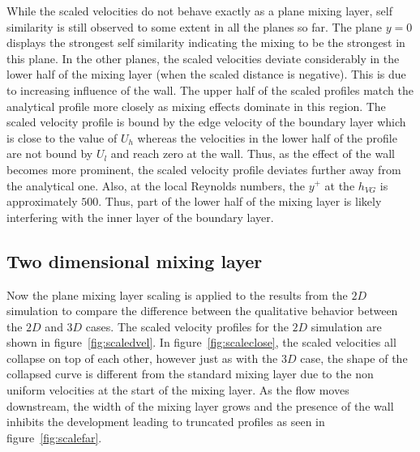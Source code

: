 While the scaled velocities do not behave exactly as a plane mixing layer, self similarity is still observed to some extent in all the planes so far. The plane $y=0$ displays the strongest self similarity indicating the mixing to be the strongest in this plane. In the other planes, the scaled velocities deviate considerably in the lower half of the mixing layer (when the scaled distance is negative). This is due to increasing influence of the wall. The upper half of the scaled profiles match the analytical profile more closely as mixing effects dominate in this region. The scaled velocity profile is bound by the edge velocity of the boundary layer which is close to the value of $U_h$ whereas the velocities in the lower half of the profile are not bound by $U_l$ and reach zero at the wall. Thus, as the effect of the wall becomes more prominent, the scaled velocity profile deviates further away from the analytical one. Also, at the local Reynolds numbers, the $y^+$ at the $h_{VG}$ is approximately $500$. Thus, part of the lower half of the mixing layer is likely interfering with the inner layer of the boundary layer. %
\subsection{Two dimensional mixing layer}
Now the plane mixing layer scaling is applied to the results from the $2D$ simulation to compare the difference between the qualitative behavior between the $2D$ and $3D$ cases. The scaled velocity profiles for the $2D$ simulation are shown in figure~\ref{fig:scaledvel}. In figure~\ref{fig:scaleclose}, the scaled velocities all collapse on top of each other, however just as with the $3D$ case, the shape of the collapsed curve is different from the standard mixing layer due to the non uniform velocities at the start of the mixing layer. As the flow moves downstream, the width of the mixing layer grows and the presence of the wall inhibits the development leading to truncated profiles as seen in figure~\ref{fig:scalefar}. 

